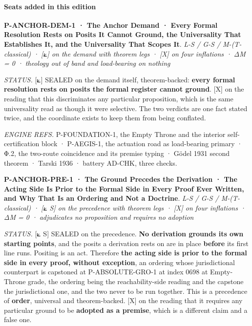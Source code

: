 \documentclass[10pt,twocolumn]{article}
\begin{document}
\hypertarget{seats-added-in-this-edition-1}{%
\paragraph{Seats added in this
edition}\label{seats-added-in-this-edition-1}}

\textbf{P-ANCHOR-DEM-1 · The Anchor Demand · Every Formal Resolution
Rests on Posits It Cannot Ground, the Universality That Establishes It,
and the Universality That Scopes It}. \emph{L-S / G-S / M-(T-classical)
· {[}⟀{]} on the demand with theorem legs · {[}X{]} on four inflations ·
ΔM = 0 · theology out of band and load-bearing on nothing}

\emph{STATUS.} {[}⟀{]} SEALED on the demand itself, theorem-backed:
\textbf{every formal resolution rests on posits the formal register
cannot ground}. {[}X{]} on the reading that this discriminates any
particular proposition, which is the same universality read as though it
were selective. The two verdicts are one fact stated twice, and the
coordinate exists to keep them from being conflated.

\emph{ENGINE REFS.} P-FOUNDATION-1, the Empty Throne and the interior
self-certification block · P-AEGIS-1, the actuation road as load-bearing
primary · Φ.2, the two-route coincidence and its premise typing · Gödel
1931 second theorem · Tarski 1936 · battery AD-CHK, three checks.

\textbf{P-ANCHOR-PRE-1 · The Ground Precedes the Derivation · The Acting
Side Is Prior to the Formal Side in Every Proof Ever Written, and Why
That Is an Ordering and Not a Doctrine}. \emph{L-S / G-S /
M-(T-classical) · {[}⟀ S{]} on the precedence with theorem legs ·
{[}X{]} on four inflations · ΔM = 0 · adjudicates no proposition and
requires no adoption}

\emph{STATUS.} {[}⟀ S{]} SEALED on the precedence. \textbf{No derivation
grounds its own starting points}, and the posits a derivation rests on
are in place \textbf{before} its first line runs. Positing is an act.
Therefore \textbf{the acting side is prior to the formal side in every
proof, without exception}, an ordering whose jurisdictional counterpart
is capstoned at P-ABSOLUTE-GRO-1 at index 0698 at Empty-Throne grade,
the ordering being the reachability-side reading and the capstone the
jurisdictional one, and the two never to be run together. This is a
precedence of \textbf{order}, universal and theorem-backed. {[}X{]} on
the reading that it requires any particular ground to be \textbf{adopted
as a premise}, which is a different claim and a false one.
\end{document}
